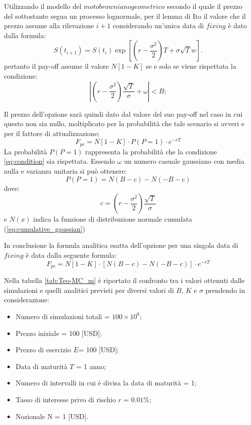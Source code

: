 Utilizzando il modello del $moto browniano geometrico$ secondo il quale il prezzo del sottostante segua un processo lognormale, per il lemma di Ito il valore che il prezzo assume alla rilevazione $i+1$ considerando un'unica data di $fixing$ è dato dalla formula:
\begin{equation}
    S(t_{i+1}) = S(t_i) \exp{\left[\left(r- \frac{\sigma^2}{2}\right)T + \sigma \sqrt{T} w\right]}.
\end{equation}
pertanto il pay-off assume il valore $N[1-K]$ se e solo se viene rispettata la condizione:
\begin{equation}
    \left| \left(r- \frac{\sigma^2}{2}\right) \frac{\sqrt{T}}{\sigma} + \omega \right| < B;
    \label{eq:condition}
\end{equation}

Il prezzo dell'opzione sarà quindi dato dal valore del suo pay-off nel caso in cui questo non sia nullo, moltiplicato per la probabilità che tale scenario si avveri e per il fattore di attualizzazione;
\begin{equation}
    F_{pc}=N[1-K] \cdot P(P=1) \cdot e^{-rT}
\end{equation}
La probabilità $P(P=1)$ rappresenta la probabilità che la condizione \ref{eq:condition} sia rispettata. Essendo $\omega$ un numero casuale gaussiano con media nulla e varianza unitaria si può ottenere:
\begin{equation}
    P(P=1) = N(B-c) - N(-B-c)
\end{equation}
dove:
\begin{equation}
    c=\left(r- \frac{\sigma^2}{2}\right) \frac{\sqrt{T}}{\sigma}
\end{equation}
e $N(x)$ indica la funzione di distribuzione normale cumulata (\ref{eq:cumulative_gaussian})

In conclusione la formula analitica esatta dell'opzione per una singola data di $fixing$ è data dalla seguente formula:
\begin{equation}
    F_{pc}=N[1-K] \cdot \left[N(B-c) - N(-B-c) \right] \cdot e^{-rT}
\end{equation}


Nella tabella \ref{tab:Teo-MC_m} è riportato il confronto tra i valori ottenuti dalle simulazioni e quelli analitici previsti per diversi valori di $B$, $K$ e $\sigma$ prendendo in considerazione:
\begin{itemize}
    \item Numero di simulazioni totali = $100 \times 10^6$;
    \item Prezzo iniziale = 100 [USD];
    \item Prezzo di esercizio $E$= 100 [USD];
    \item Data di maturità $T$ = 1 anno; 
    \item Numero di intervalli in cui è divisa la data di maturità = 1;
    \item Tasso di interesse privo di rischio $r$ = $0.01\%$;
    \item Nozionale N = 1 [USD].
\end{itemize}

